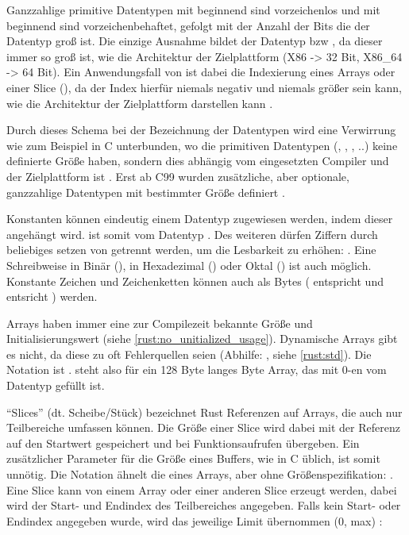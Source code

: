 Ganzzahlige primitive Datentypen mit  beginnend sind vorzeichenlos und mit  beginnend sind vorzeichenbehaftet, gefolgt mit der Anzahl der Bits  die der Datentyp groß ist.
 Die einzige Ausnahme bildet der Datentyp  bzw , da dieser immer so groß ist, wie die Architektur der Zielplattform (X86 -> 32 Bit, X86\_64 -> 64 Bit).
Ein Anwendungsfall von  ist dabei die Indexierung eines Arrays oder einer Slice (), da der Index hierfür niemals negativ und niemals größer sein kann, wie die Architektur der Zielplattform darstellen kann .

Durch dieses Schema bei der Bezeichnung der Datentypen wird eine Verwirrung wie zum Beispiel in C unterbunden, wo die primitiven Datentypen (, , , ..) keine definierte Größe haben, sondern dies abhängig vom eingesetzten Compiler und der Zielplattform ist \cite[187]{deitel2013c}. Erst ab C99 wurden zusätzliche, aber optionale, ganzzahlige Datentypen mit bestimmter Größe definiert \cite[141]{goll2014c}.

Konstanten können eindeutig einem Datentyp zugewiesen werden, indem dieser angehängt wird.
 ist somit vom Datentyp .
Des weiteren dürfen Ziffern durch beliebiges setzen von \rustcinline{_} getrennt werden, um die Lesbarkeit zu erhöhen: .
Eine Schreibweise in Binär (), in Hexadezimal () oder Oktal () ist auch möglich. 
Konstante Zeichen und Zeichenketten können auch als Bytes ( entspricht  und  entsricht \rustcinline{&[u8]})  werden.

Arrays haben immer eine zur Compilezeit bekannte Größe und Initialisierungswert (siehe \autoref{rust:no_unitialized_usage}).
Dynamische Arrays gibt es nicht, da diese zu oft Fehlerquellen seien  (Abhilfe: , siehe \autoref{rust:std}).
Die Notation ist .
\rustcinline{[0_u8; 128]} steht also für ein 128 Byte langes Byte Array, das mit 0-en vom Datentyp  gefüllt ist.

\enquote{Slices} (dt. Scheibe/Stück) bezeichnet Rust Referenzen auf Arrays, die auch nur Teilbereiche umfassen können.
Die Größe einer Slice wird dabei mit der Referenz auf den Startwert gespeichert  und bei Funktionsaufrufen übergeben.
Ein zusätzlicher Parameter für die Größe eines Buffers, wie in C üblich, ist somit unnötig.
Die Notation ähnelt die eines Arrays, aber ohne Größenspezifikation: \rustcinline{[<Datentyp>]}.
Eine Slice kann von einem Array oder einer anderen Slice erzeugt werden, dabei wird der Start- und Endindex des Teilbereiches angegeben.
Falls kein Start- oder Endindex angegeben wurde, wird das jeweilige Limit übernommen (0, max) : 

